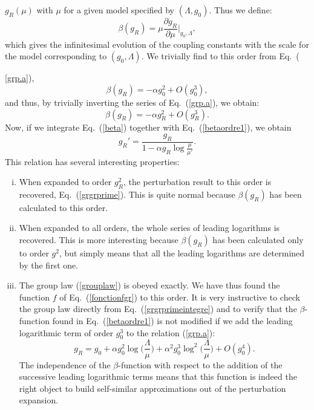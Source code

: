 \documentclass[floatfix,preprintnumbers,amsmath,amssymb,prb,12pt]{revtex4-1}
\begin{document}
$g_R(\mu)$ with $\mu$ for a given model specified by
$(\Lambda,g_0)$. Thus we define:
\begin{equation} 
\beta(g_R)=\mu\frac{\partial
g_R}{\partial\mu}\bigg|_{g_0,\Lambda},
\label{beta}
\end{equation}
which gives the infinitesimal evolution of the coupling constants
with the scale for the model corresponding to 
$(g_0,\Lambda)$. We trivially find to this order from
Eq.~({\ref{grp.a}),
\begin{equation}
\beta(g_R) =-\alpha g_0^2 +O(g_0^3),
\label{betag0}
\end{equation}
and thus, by trivially inverting the series of Eq.~(\ref{grp.a}), we
obtain:
\begin{equation}
\beta(g_R) =-\alpha g_R^2 +O(g_R^3).
\label{betaordre1}
\end{equation}
Now, if we integrate Eq.~(\ref{beta}) together with
Eq.~(\ref{betaordre1}), we obtain
\begin{equation}
g_R'=\frac{g_R}{1-\alpha g_R \log\frac{\mu}{\mu'}}.
\label{grgrprimeintegre}
\end{equation}
This relation has several interesting properties:

\begin{enumerate}[(i)]

\item When expanded to order $g_R^2$, the perturbation result
to this order is recovered, Eq.~(\ref{grgrprime}). This is quite
normal because $\beta(g_R)$ has been calculated to this order.

\item When expanded to all orders, the whole series of leading
logarithms is recovered. This is more interesting because
$\beta(g_R)$ has been calculated only to order $g^2$, but 
simply means that all the leading logarithms are
determined by the first one.

\item The group law (\ref{grouplaw}) is obeyed exactly. We
have thus found the function $f$ of Eq.~(\ref{fonctionfgr}) to
this order. It is very instructive to check the group law directly
from Eq.~(\ref{grgrprimeintegre}) and to verify that the
$\beta$-function found in Eq.~(\ref{betaordre1}) is not
modified if we add the leading logarithmic term of order $g_0^3$
to the relation (\ref{grp.a}): 
\begin{equation}
g_R=g_0 +\alpha g_0^2 \log\big(\frac{\Lambda}{\mu}\big)+\alpha^2
g_0^3 \log^2\big(\frac{\Lambda}{\mu}\big) + O(g_0^4).
\label{relationordre3grg0}
\end{equation}
The independence of the $\beta$-function with respect to the addition of
the successive leading logarithmic terms means that this function is indeed
the right object to build self-similar approximations out of the
perturbation expansion. 


\end{enumerate}}
\end{document}
